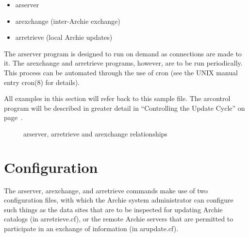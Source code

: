 \begin{itemize}
\item arserver

\item arexchange (inter-Archie exchange)

\item arretrieve (local Archie updates)
\end{itemize}





The arserver program is designed to run on demand as connections are made to
it. The arexchange and arretrieve programs, however, are to be run
periodically. This process can be automated through the use of cron (see the
UNIX manual entry cron(8) for details).











All examples in this section will refer back to this sample file. The
arcontrol program will be described in greater detail in ``Controlling the
Update Cycle'' on page~\pageref{sec:control}.



\begin{figure}[!htb]
\begin{center}
\end{center}
\caption{arserver, arretrieve and arexchange relationships}
\end{figure}




%
%
%

\section{Configuration}
\label{sec:configuration}

The arserver, arexchange, and arretrieve commands make use of two
configuration files, with which the Archie system administrator can configure
such things as the data sites that are to be inspected for updating Archie
catalogs (in arretrieve.cf), or the remote Archie servers that are permitted
to participate in an exchange of information (in arupdate.cf).

